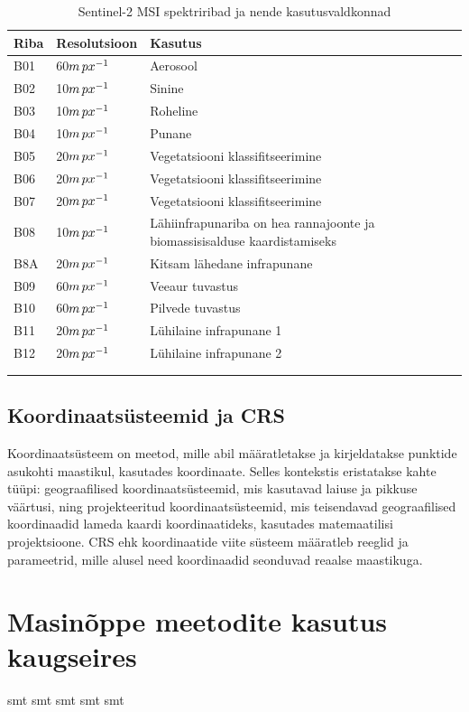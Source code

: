 \begin{longtable}{llll}
    \hline
    Riba & Resolutsioon & Kasutus                          \\ 
    \hline
    B01  & 60$m \mkern3mu px^{-1}$        & Aerosool                         \\
    B02  & 10$m \mkern3mu px^{-1}$        & Sinine                           \\
    B03  & 10$m \mkern3mu px^{-1}$        & Roheline                         \\
    B04  & 10$m \mkern3mu px^{-1}$        & Punane                           \\
    B05  & 20$m \mkern3mu px^{-1}$        & Vegetatsiooni klassifitseerimine \\
    B06  & 20$m \mkern3mu px^{-1}$        & Vegetatsiooni klassifitseerimine \\
    B07  & 20$m \mkern3mu px^{-1}$        & Vegetatsiooni klassifitseerimine \\
    B08  & 10$m \mkern3mu px^{-1}$        & Lähiinfrapunariba on hea rannajoonte ja biomassisisalduse kaardistamiseks \\
    B8A  & 20$m \mkern3mu px^{-1}$        & Kitsam lähedane infrapunane  \\
    B09  & 60$m \mkern3mu px^{-1}$        & Veeaur tuvastus                       \\
    B10  & 60$m \mkern3mu px^{-1}$        & Pilvede tuvastus                      \\
    B11  & 20$m \mkern3mu px^{-1}$        & Lühilaine infrapunane 1      \\
    B12  & 20$m \mkern3mu px^{-1}$        & Lühilaine infrapunane 2      \\
         &              &                    &                              \\ \hline
    \caption{Sentinel-2 MSI spektriribad ja nende kasutusvaldkonnad}
    \label{tab:s2bands}
\end{longtable}

\subsection{Koordinaatsüsteemid ja CRS}
Koordinaatsüsteem on meetod, mille abil määratletakse ja kirjeldatakse punktide
asukohti maastikul, kasutades koordinaate. Selles kontekstis eristatakse kahte
tüüpi: geograafilised koordinaatsüsteemid, mis kasutavad laiuse ja pikkuse
väärtusi, ning projekteeritud koordinaatsüsteemid, mis teisendavad
geograafilised koordinaadid lameda kaardi koordinaatideks, kasutades
matemaatilisi projektsioone. CRS ehk koordinaatide viite süsteem määratleb
reeglid ja parameetrid, mille alusel need koordinaadid seonduvad reaalse
maastikuga. \cite{8CoordinateReference}

\section{Masinõppe meetodite kasutus kaugseires}
smt smt smt smt smt
